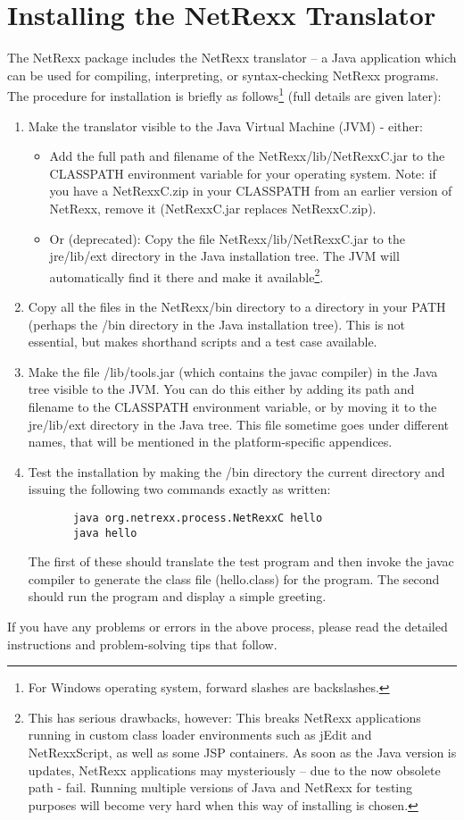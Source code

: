 \section{Installing the NetRexx Translator}
The NetRexx package includes the NetRexx translator – a Java application which can be used for compiling, interpreting, or syntax-checking NetRexx programs. The procedure for installation is briefly as follows\footnote{For Windows operating system, forward slashes are backslashes.} (full details are given later):
\begin{enumerate}
\item Make the translator visible to the Java Virtual Machine (JVM) - either:
\begin{itemize} 
\item Add the full path and filename of the NetRexx/lib/NetRexxC.jar to the CLASSPATH environment variable for your operating system. 
Note: if you have a NetRexxC.zip in your CLASSPATH from an earlier version of NetRexx, remove it (NetRexxC.jar replaces NetRexxC.zip).
\item Or (deprecated): Copy the file NetRexx/lib/NetRexxC.jar to the jre/lib/ext directory in the Java installation tree. The JVM will automatically find it there and make it available\footnote{ This has serious drawbacks, however:
This breaks NetRexx applications running in custom class loader environments such as jEdit and NetRexxScript, as well as some JSP containers.
As soon as the Java version is updates, NetRexx applications may mysteriously – due to the now obsolete path - fail.
Running multiple versions of Java and NetRexx for testing purposes will become very hard when this way of installing is chosen.}.
\end{itemize}
\item Copy all the files in the NetRexx/bin directory to a directory in your PATH (perhaps the /bin directory in the Java installation tree). This is not essential, but makes shorthand scripts and a test case available. 
\item Make the file /lib/tools.jar (which contains the javac compiler) in the Java tree visible to the JVM. You can do this either by adding its path and filename to the CLASSPATH environment variable, or by moving it to the jre/lib/ext directory in the Java tree. This file sometime goes under different names, that will be mentioned in the platform-specific appendices.
\item Test the installation by making the /bin directory the current directory and issuing the following two commands exactly as written: 
\begin{verbatim}
       java org.netrexx.process.NetRexxC hello
       java hello
\end{verbatim}
The first of these should translate the test program and then invoke the javac compiler to generate the class file (hello.class) for the program. The second should run the program and
display a simple greeting.
\end{enumerate}
If you have any problems or errors in the above process, please read the detailed instructions and problem-solving tips that follow. 

